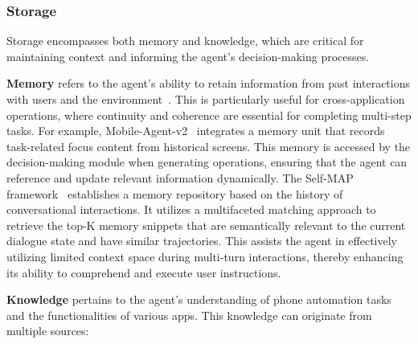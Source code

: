\subsubsection{Storage}

Storage encompasses both memory and knowledge, which are critical for maintaining context and informing the agent's decision-making processes.


\noindent\textbf{Memory}
refers to the agent's ability to retain information from past interactions with users and the environment~\cite{xi2023rise}. This is particularly useful for cross-application operations, where continuity and coherence are essential for completing multi-step tasks. For example, Mobile-Agent-v2~\cite{wang2024mobileagentv2} integrates a memory unit that records task-related focus content from historical screens. This memory is accessed by the decision-making module when generating operations, ensuring that the agent can reference and update relevant information dynamically.
The Self-MAP framework~\cite{deng2024multi} establishes a memory repository based on the history of conversational interactions. It utilizes a multifaceted matching approach to retrieve the top-K memory snippets that are semantically relevant to the current dialogue state and have similar trajectories. This assists the agent in effectively utilizing limited context space during multi-turn interactions, thereby enhancing its ability to comprehend and execute user instructions.



\noindent\textbf{Knowledge}
pertains to the agent's understanding of phone automation tasks and the functionalities of various apps. This knowledge can originate from multiple sources:

